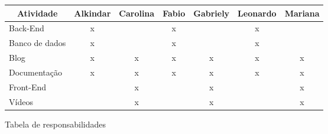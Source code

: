 \begin{center}
\begin{tabular}{|l|c|c|c|c|c|c|}
\hline
\multicolumn{1}{|c|}{\textbf{Atividade}} & \textbf{Alkindar}     & \textbf{Carolina}     & \textbf{Fabio}        & \textbf{Gabriely}     & \textbf{Leonardo}     & \textbf{Mariana}      \\ \hline
Back-End                                 & x                     & \multicolumn{1}{l|}{} & x                     & \multicolumn{1}{l|}{} & x                     & \multicolumn{1}{l|}{} \\ \hline
Banco de dados                           & x                     & \multicolumn{1}{l|}{} & x                     & \multicolumn{1}{l|}{} & x                     & \multicolumn{1}{l|}{} \\ \hline
Blog                                     & x                     & x                     & x                     & x                     & x                     & x                     \\ \hline
Documentação                             & x                     & x                     & x                     & x                     & x                     & x                     \\ \hline
Front-End                                & \multicolumn{1}{l|}{} & x                     & \multicolumn{1}{l|}{} & x                     & \multicolumn{1}{l|}{} & x                     \\ \hline
Vídeos                                   & \multicolumn{1}{l|}{} & x                     & \multicolumn{1}{l|}{} & x                     & \multicolumn{1}{l|}{} & x                     \\ \hline
\end{tabular}

\caption{Tabela de responsabilidades}\label{tab:tab_resp}
\end{center}
